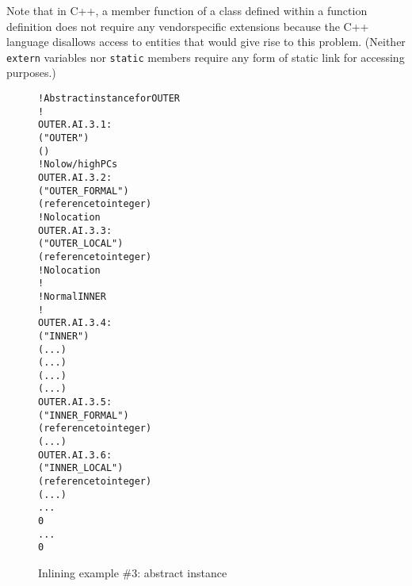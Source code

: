 Note that in C++, a member function of a class defined within
a function definition does not require any vendor\dash specific
extensions because the C++ language disallows access to
entities that would give rise to this problem. (Neither \texttt{extern}
variables nor \texttt{static} members require any form of static link
for accessing purposes.)

\begin{figure}[t]
\begin{dwflisting}
\begin{alltt}
    ! Abstract instance for OUTER
    ! 
OUTER.AI.3.1:
        ("OUTER")
        ()
        ! No low/high PCs
OUTER.AI.3.2:
            ("OUTER\_FORMAL")
            (reference to integer)
            ! No location
OUTER.AI.3.3:
            ("OUTER\_LOCAL")
            (reference to integer)
            ! No location
        !
        ! Normal INNER
        !
OUTER.AI.3.4:
            ("INNER")
            (...)
            (...)
            (...)
            (...)
OUTER.AI.3.5:
                ("INNER\_FORMAL")
                (reference to integer)
                (...)
OUTER.AI.3.6:
                ("INNER\_LOCAL")
                (reference to integer)
                (...)
            ...
            0
        ...
        0
\end{alltt}
\end{dwflisting}
\caption{Inlining example \#3: abstract instance}
\label{fig:inliningexample3abstractinstance}
\end{figure}

